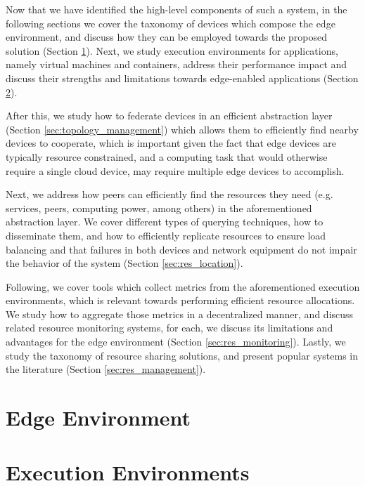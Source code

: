 Now that we have identified the high-level components of such a system, in the following sections we cover the taxonomy of devices which compose the edge environment, and discuss how they can be employed towards the proposed solution (Section \ref{sec:edge_computing}). Next, we study execution environments for applications, namely virtual machines and containers, address their performance impact and discuss their strengths and limitations towards edge-enabled applications (Section \ref{sec:runtime_environments}). 

After this, we study how to federate devices in an efficient abstraction layer (Section \ref{sec:topology_management}) which allows them to efficiently find nearby devices to cooperate, which is important given the fact that edge devices are typically resource constrained, and a computing task that would otherwise require a single cloud device, may require multiple edge devices to accomplish.

Next, we address how peers can efficiently find the resources they need (e.g. services, peers, computing power, among others) in the aforementioned abstraction layer. We cover different types of querying techniques, how to disseminate them, and how to efficiently replicate resources to ensure load balancing and that failures in both devices and network equipment do not impair the behavior of the system (Section \ref{sec:res_location}).

Following, we cover tools which collect metrics from the aforementioned execution environments, which is relevant towards performing efficient resource allocations. We study how to aggregate those metrics in a decentralized manner, and discuss related resource monitoring systems, for each, we discuss its limitations and advantages for the edge environment (Section \ref{sec:res_monitoring}). Lastly, we study the taxonomy of resource sharing solutions, and present popular systems in the literature (Section \ref{sec:res_management}). 

\section{Edge Environment} \label{sec:edge_computing} 

\section{Execution Environments} \label{sec:runtime_environments} 

